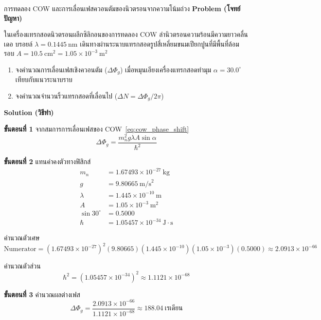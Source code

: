 \begin{psctbox}{การทดลอง COW และการเลื่อนเฟสควอนตัมของนิวตรอนจากความโน้มถ่วง}
\textbf{Problem (โจทย์ปัญหา)}

ในเครื่องแทรกสอดนิวตรอนผลึกซิลิกอนของการทดลอง COW ลำนิวตรอนความร้อนมีความยาวคลื่นเดอ บรอยล์ $\lambda = 0.1445~\text{nm}$ เดินทางผ่านระนาบแทรกสอดรูปสี่เหลี่ยมขนมเปียกปูนที่มีพื้นที่ล้อมรอบ $A = 10.5~\text{cm}^2 = 1.05 \times 10^{-3}~\text{m}^2$
\begin{enumerate}
    \item จงคำนวณการเลื่อนเฟสเชิงควอนตัม ($\Delta\Phi_g$) เมื่อหมุนเอียงเครื่องแทรกสอดทำมุม $\alpha = 30.0^\circ$ เทียบกับแนวระนาบราบ
    \item จงคำนวณจำนวนริ้วแทรกสอดที่เลื่อนไป ($\Delta N = \Delta\Phi_g / 2\pi$)
\end{enumerate}

\textbf{Solution (วิธีทำ)}

\textbf{ขั้นตอนที่ 1} จากสมการการเลื่อนเฟสของ COW~\eqref{eq:cow_phase_shift}
\begin{equation*}
\Delta\Phi_g = \frac{m_n^2 g \lambda A \sin\alpha}{\hbar^2}
\end{equation*}

\textbf{ขั้นตอนที่ 2} แทนค่าคงตัวทางฟิสิกส์
\begin{align*}
m_n &= 1.67493 \times 10^{-27}~\text{kg} \\
g &= 9.80665~\text{m/s}^2 \\
\lambda &= 1.445 \times 10^{-10}~\text{m} \\
A &= 1.05 \times 10^{-3}~\text{m}^2 \\
\sin 30^\circ &= 0.5000 \\
\hbar &= 1.05457 \times 10^{-34}~\text{J}\cdot\text{s}
\end{align*}

คำนวณตัวเศษ
\begin{equation*}
\text{Numerator} = (1.67493 \times 10^{-27})^2 (9.80665)(1.445 \times 10^{-10})(1.05 \times 10^{-3})(0.5000) \approx 2.0913 \times 10^{-66}
\end{equation*}

คำนวณตัวส่วน
\begin{equation*}
\hbar^2 = (1.05457 \times 10^{-34})^2 \approx 1.1121 \times 10^{-68}
\end{equation*}

\textbf{ขั้นตอนที่ 3} คำนวณผลต่างเฟส
\begin{equation*}
\Delta\Phi_g = \frac{2.0913 \times 10^{-66}}{1.1121 \times 10^{-68}} \approx 188.04~\text{เรเดียน}
\end{equation*}


\end{psctbox}
